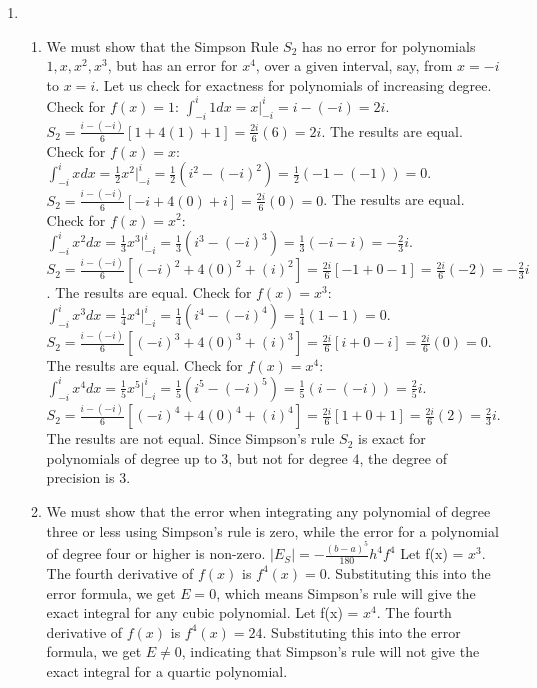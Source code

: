 \documentclass[12pt]{article}
\begin{document}
\begin{enumerate}[leftmargin=2em]
    \item 
    \begin{enumerate}[leftmargin=!]
        \item We must show that the Simpson Rule $S_2$ has no error for polynomials $1, x, x^{2}, x^{3}$, but has an error for $x^{4}$, over a given interval, say, from $x = -i$ to $x = i$. Let us check for exactness for polynomials of increasing degree.
        Check for \(f(x)=1\):
        \(\int _{-i}^{i}1dx=x\Big|_{-i}^{i}=i-(-i)=2i\).
        \(S_{2}=\frac{i-(-i)}{6}[1+4(1)+1]=\frac{2i}{6}(6)=2i\).
        The results are equal.
        Check for \(f(x)=x\):
        \(\int _{-i}^{i}xdx=\frac{1}{2}x^{2}\Big|_{-i}^{i}=\frac{1}{2}(i^{2}-(-i)^{2})=\frac{1}{2}(-1-(-1))=0\).
        \(S_{2}=\frac{i-(-i)}{6}[-i+4(0)+i]=\frac{2i}{6}(0)=0\).
        The results are equal.
        Check for \(f(x)=x^{2}\):
        \(\int _{-i}^{i}x^{2}dx=\frac{1}{3}x^{3}\Big|_{-i}^{i}=\frac{1}{3}(i^{3}-(-i)^{3})=\frac{1}{3}(-i-i)=-\frac{2}{3}i\).
        \(S_{2}=\frac{i-(-i)}{6}[(-i)^{2}+4(0)^{2}+(i)^{2}]=\frac{2i}{6}[-1+0-1]=\frac{2i}{6}(-2)=-\frac{2}{3}i\).
        The results are equal.
        Check for \(f(x)=x^{3}\):
        \(\int _{-i}^{i}x^{3}dx=\frac{1}{4}x^{4}\Big|_{-i}^{i}=\frac{1}{4}(i^{4}-(-i)^{4})=\frac{1}{4}(1-1)=0\).
        \(S_{2}=\frac{i-(-i)}{6}[(-i)^{3}+4(0)^{3}+(i)^{3}]=\frac{2i}{6}[i+0-i]=\frac{2i}{6}(0)=0\).
        The results are equal.
        Check for \(f(x)=x^{4}\):
        \(\int _{-i}^{i}x^{4}dx=\frac{1}{5}x^{5}\Big|_{-i}^{i}=\frac{1}{5}(i^{5}-(-i)^{5})=\frac{1}{5}(i-(-i))=\frac{2}{5}i\).
        \(S_{2}=\frac{i-(-i)}{6}[(-i)^{4}+4(0)^{4}+(i)^{4}]=\frac{2i}{6}[1+0+1]=\frac{2i}{6}(2)=\frac{2}{3}i\).
        The results are not equal.
        Since Simpson's rule \(S_{2}\) is exact for polynomials of degree up to \(3\), but not for degree \(4\), the degree of precision is \(3\).
        \item We must show that the error when integrating any polynomial of degree three or less using Simpson's rule is zero, while the error for a polynomial of degree four or higher is non-zero.
        \(|E_{S}| = -\frac{(b-a)^{5}}{180}h^{4}f^{4}\)
        Let f(x) = $x^3$. The fourth derivative of $f(x)$ is $f^{4}(x) = 0$. Substituting this into the error formula, we get $E = 0$, which means Simpson's rule will give the exact integral for any cubic polynomial.
        Let f(x) = $x^4$. The fourth derivative of $f(x)$ is $f^{4}(x) = 24$. Substituting this into the error formula, we get $E \neq 0$, indicating that Simpson's rule will not give the exact integral for a quartic polynomial.

\end{enumerate}
\end{enumerate}
\end{document}
